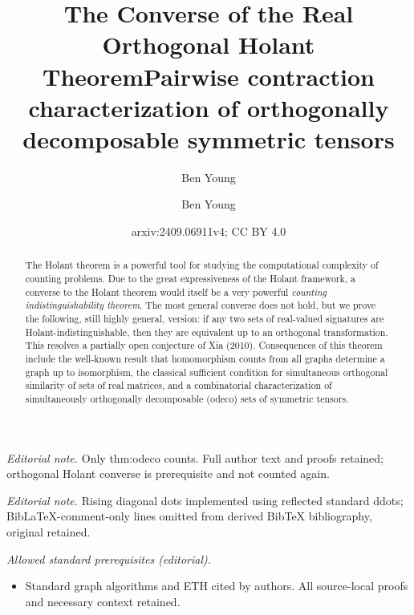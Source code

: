 \documentclass{article}
\author{Ben Young}\date{}
\title{The Converse of the Real Orthogonal Holant Theorem}
\title{Pairwise contraction characterization of orthogonally decomposable symmetric tensors}
\author{Ben Young}
\date{arxiv:2409.06911v4; CC BY 4.0}
\begin{document}
\maketitle
\noindent\textit{Editorial note.} Only thm:odeco counts. Full author text and proofs retained; orthogonal Holant converse is prerequisite and not counted again.\par\medskip
\noindent\textit{Editorial note.} Rising diagonal dots implemented using reflected standard ddots; BibLaTeX-comment-only lines omitted from derived BibTeX bibliography, original retained.\par\medskip
\noindent\textit{Allowed standard prerequisites (editorial).}\begin{itemize}
\item Standard graph algorithms and ETH cited by authors. All source-local proofs and necessary context retained.
\end{itemize}\medskip
\maketitle

\begin{abstract}
The Holant theorem is a powerful tool for studying the computational complexity of
counting problems. Due to the great expressiveness of the Holant framework,
a converse to the Holant theorem would itself be a very powerful 
\emph{counting indistinguishability theorem}. The most general converse does not hold, but we prove
the following, still highly general, version:
if any two sets of real-valued signatures are Holant-indistinguishable, then they are equivalent 
up to an orthogonal transformation. This resolves a partially open conjecture of Xia (2010).
Consequences of this theorem include the well-known result that homomorphism counts from all graphs
determine a graph up to isomorphism, the classical sufficient condition for simultaneous orthogonal
similarity of sets of real matrices,
and a combinatorial characterization of simultaneously orthogonally decomposable (odeco) sets of 
symmetric tensors.
\end{abstract}

\end{document}

